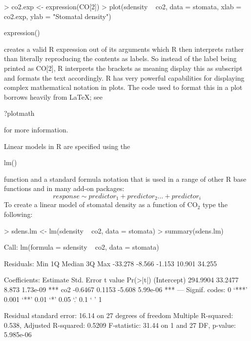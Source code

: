 \documentclass[letterpaper,10pt]{article}
\newcommand{\R}{\textsf{R}\xspace}
\newenvironment{rline}{\begin{small}\begin{ttfamily}}{\end{ttfamily}\end{small}}
\begin{document}
\begin{Schunk}
\begin{Sinput}
> co2.exp <- expression(CO[2])
> plot(sdensity ~ co2, data = stomata, xlab = co2.exp, ylab = "Stomatal density")
\end{Sinput}
\end{Schunk}

\begin{rline}expression()\end{rline} creates a valid \R expression out of its arguments which \R then interprets rather than literally reproducing the contents as labels. So instead of the label being printed as CO[2], \R interprets the brackets as meaning display this as subscript and formats the text accordingly. \R has very powerful capabilities for displaying complex mathematical notation in plots. The code used to format this in a plot borrows heavily from \LaTeX; see \begin{rline}?plotmath\end{rline} for more information.

Linear models in \R are specified using the \begin{rline}lm()\end{rline} function and a standard formula notation that is used in a range of other R base functions and in many add-on packages:
\begin{displaymath}
    response \sim predictor_1 + predictor_2 \ldots + predictor_i
\end{displaymath}
To create a linear model of stomatal density as a function of $\mathrm{CO}_2$ type the following:

\begin{Schunk}
\begin{Sinput}
> sdens.lm <- lm(sdensity ~ co2, data = stomata)
> summary(sdens.lm)
\end{Sinput}
\begin{Soutput}
Call:
lm(formula = sdensity ~ co2, data = stomata)

Residuals:
    Min      1Q  Median      3Q     Max 
-33.278  -8.566  -1.153  10.901  34.255 

Coefficients:
            Estimate Std. Error t value Pr(>|t|)    
(Intercept) 294.9904    33.2477   8.873 1.73e-09 ***
co2          -0.6467     0.1153  -5.608 5.99e-06 ***
---
Signif. codes:  0 ‘***’ 0.001 ‘**’ 0.01 ‘*’ 0.05 ‘.’ 0.1 ‘ ’ 1

Residual standard error: 16.14 on 27 degrees of freedom
Multiple R-squared:  0.538,	Adjusted R-squared:  0.5209 
F-statistic: 31.44 on 1 and 27 DF,  p-value: 5.985e-06
\end{Soutput}
\end{Schunk}
\end{document}
